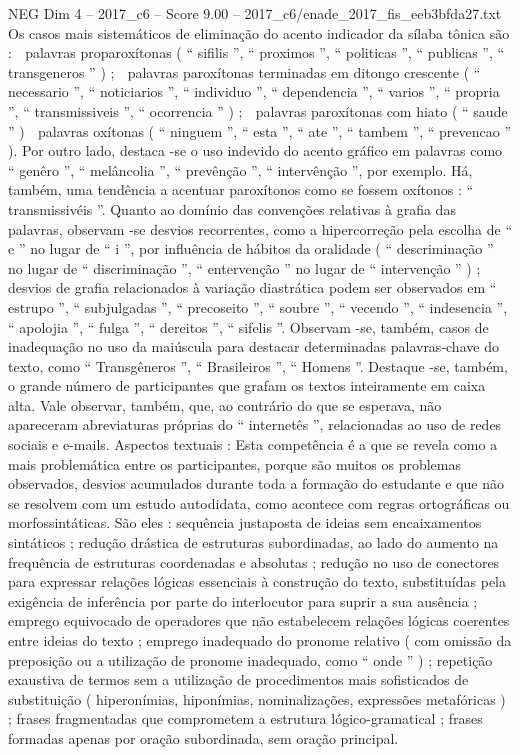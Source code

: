 \begin{textsample}{NEG Dim 4 – 2017\_c6 – Score 9.00 – 2017\_c6/enade\_2017\_fis\_eeb3bfda27.txt}
Os casos mais sistemáticos de eliminação do acento indicador da sílaba tônica são :  palavras proparoxítonas ( “ sifilis ”, “ proximos ”, “ politicas ”, “ publicas ”, “ transgeneros ” ) ;  palavras paroxítonas terminadas em ditongo crescente ( “ necessario ”, “ noticiarios ”, “ individuo ”, “ dependencia ”, “ varios ”, “ propria ”, “ transmissiveis ”, “ ocorrencia ” ) ;  palavras paroxítonas com hiato ( “ saude ” )  palavras oxítonas ( “ ninguem ”, “ esta ”, “ ate ”, “ tambem ”, “ prevencao ” ).
Por outro lado, destaca -se o uso indevido do acento gráfico em palavras como “ genêro ”, “ melâncolia ”, “ prevênção ”, “ intervênção ”, por exemplo.
Há, também, uma tendência a acentuar paroxítonos como se fossem oxítonos : “ transmissivéis ”.
Quanto ao domínio das convenções relativas à grafia das palavras, observam -se desvios recorrentes, como a hipercorreção pela escolha de “ e ” no lugar de “ i ”, por influência de hábitos da oralidade ( “ descriminação ” no lugar de “ discriminação ”, “ entervenção ” no lugar de “ intervenção ” ) ; desvios de grafia relacionados à variação diastrática podem ser observados em “ estrupo ”, “ subjulgadas ”, “ precoseito ”, “ soubre ”, “ vecendo ”, “ indesencia ”, “ apolojia ”, “ fulga ”, “ dereitos ”, “ sifelis ”.
Observam -se, também, casos de inadequação no uso da maiúscula para destacar determinadas palavras-chave do texto, como “ Transgêneros ”, “ Brasileiros ”, “ Homens ”.
Destaque -se, também, o grande número de participantes que grafam os textos inteiramente em caixa alta.
Vale observar, também, que, ao contrário do que se esperava, não apareceram abreviaturas próprias do “ internetês ”, relacionadas ao uso de redes sociais e e-mails.
Aspectos textuais : Esta competência é a que se revela como a mais problemática entre os participantes, porque são muitos os problemas observados, desvios acumulados durante toda a formação do estudante e que não se resolvem com um estudo autodidata, como acontece com regras ortográficas ou morfossintáticas.
São eles : sequência justaposta de ideias sem encaixamentos sintáticos ; redução drástica de estruturas subordinadas, ao lado do aumento na frequência de estruturas coordenadas e absolutas ; redução no uso de conectores para expressar relações lógicas essenciais à construção do texto, substituídas pela exigência de inferência por parte do interlocutor para suprir a sua ausência ; emprego equivocado de operadores que não estabelecem relações lógicas coerentes entre ideias do texto ; emprego inadequado do pronome relativo ( com omissão da preposição ou a utilização de pronome inadequado, como “ onde ” ) ; repetição exaustiva de termos sem a utilização de procedimentos mais sofisticados de substituição ( hiperonímias, hiponímias, nominalizações, expressões metafóricas ) ; frases fragmentadas que comprometem a estrutura lógico-gramatical ; frases formadas apenas por oração subordinada, sem oração principal.

\end{textsample}
